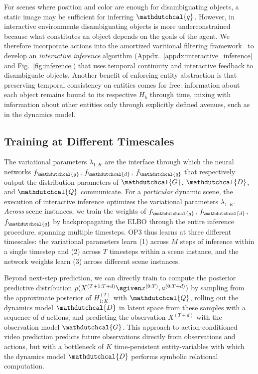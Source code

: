 For scenes where position and color are enough for disambiguating objects, a static image may be sufficient for inferring $\mathdutchcal{q}$.
However, in interactive environments disambiguating objects is more underconstrained because what constitutes an object depends on the goals of the agent.
We therefore incorporate actions into the amortized varitional filtering framework~\citep{marino2018general} to develop an \textit{interactive inference} algorithm (Appdx.~\ref{appdx:interactive_inference} and Fig.~\ref{fig:inference}) that uses temporal continuity and interactive feedback to disambiguate objects.
Another benefit of enforcing entity abstraction is that preserving temporal consistency on entities comes for free: information about each object remains bound to its respective $H_k$ through time, mixing with information about other entities only through explicitly defined avenues, such as in the dynamics model.

\subsection{Training at Different Timescales} \label{sec:training}
The variational parameters $\lambda_{1:K}$ are the interface through which the neural networks $f_{\mathdutchcal{g}}$, $f_{\mathdutchcal{d}}$, $f_{\mathdutchcal{q}}$ that respectively output the distribution parameters of $\mathdutchcal{G}$, $\mathdutchcal{D}$, and $\mathdutchcal{Q}$ communicate.
For a \textit{particular} dynamic scene, the execution of interactive inference optimizes the variational parameters $\lambda_{1:K}$.
\textit{Across} scene instances, we train the weights of $f_{\mathdutchcal{g}}$, $f_{\mathdutchcal{d}}$, $f_{\mathdutchcal{q}}$ by backpropagating the ELBO through the entire inference procedure, spanning multiple timesteps.
OP3 thus learns at three different timescales: the variational parameters learn (1) across $M$ steps of inference within a single timestep and (2) across $T$ timesteps within a scene instance, and the network weights learn (3) across different scene instances.

Beyond next-step prediction, we can directly train to compute the posterior predictive distribution $p(X^{(T+1:T+d)} \sgiven x^{(0:T)}, a^{(0:T+d)})$ by sampling from the approximate posterior of $H_{1:K}^{(T)}$ with $\mathdutchcal{Q}$, rolling out the dynamics model $\mathdutchcal{D}$ in latent space from these samples with a sequence of $d$ actions, and predicting the observation $X^{(T+d)}$ with the observation model $\mathdutchcal{G}$.
This approach to action-conditioned video prediction predicts future observations directly from observations and actions, but with a bottleneck of $K$ time-persistent entity-variables with which the dynamics model $\mathdutchcal{D}$ performs symbolic relational computation.

